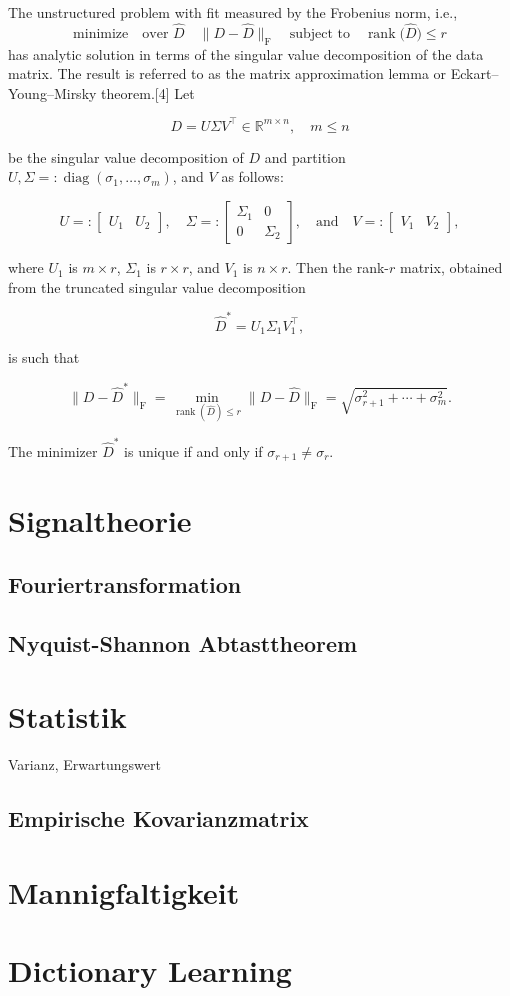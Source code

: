 \begin{thm}
The unstructured problem with fit measured by the Frobenius norm, i.e.,
$$\text{minimize} \quad \text{over } \widehat D \quad \|D - \widehat D\|_{\text{F}} \quad\text{subject to}\quad \operatorname{rank}\big(\widehat D\big) \leq r $$
has analytic solution in terms of the singular value decomposition of the data matrix. The result is referred to as the matrix approximation lemma or Eckart–Young–Mirsky theorem.[4] Let

$$D = U\Sigma V^{\top} \in \mathbb{R}^{m\times n}, \quad m \leq n$$

be the singular value decomposition of $D$ and partition $U, \Sigma=:\operatorname{diag}(\sigma_1,\ldots,\sigma_m)$, and $V$ as follows:

$$U =: \begin{bmatrix} U_1 & U_2\end{bmatrix}, \quad 
\Sigma =: \begin{bmatrix} \Sigma_1 & 0 \\ 0 & \Sigma_2 \end{bmatrix}, \quad\text{and}\quad 
V =: \begin{bmatrix} V_1 & V_2 \end{bmatrix},$$

where $U_{1}$ is $m\times r$, $\Sigma _{1}$ is $r\times r$, and $V_{1}$ is $n\times r$. Then the rank-$r$ matrix, obtained from the truncated singular value decomposition

$$\widehat D^* = U_1 \Sigma_1 V_1^{\top},$$

is such that

$$\|D-\widehat D^*\|_{\text{F}} = \min_{\operatorname{rank}(\widehat D) \leq r} \|D-\widehat D\|_{\text{F}} = \sqrt{\sigma^2_{r+1} + \cdots + \sigma^2_m}.$$

The minimizer $\widehat D^*$ is unique if and only if $\sigma_{r+1}\neq\sigma_{r}$.
\end{thm}

\section{Signaltheorie}

\subsection{Fouriertransformation}
\subsection{Nyquist-Shannon Abtasttheorem}

\section{Statistik}
Varianz, Erwartungswert
\subsection{Empirische Kovarianzmatrix}

\section{Mannigfaltigkeit}

\section{Dictionary Learning}